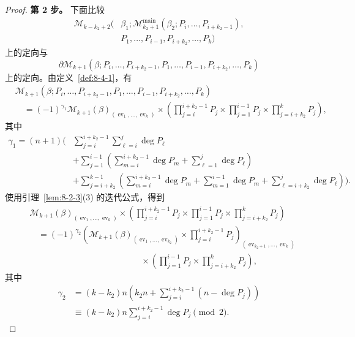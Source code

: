 \begin{proof}
\par\smallskip\noindent\textbf{第 2 步。}
下面比较
\[
\begin{aligned}
 \mathcal M_{k-k_2+2}\bigl(&\beta_1;
 \mathcal M_{k_2+1}^{\mathrm{main}}
 (\beta_2;P_i,\ldots,P_{i+k_2-1}),\\[-2pt]
 &P_1,\ldots,P_{i-1},P_{i+k_2},\ldots,P_k\bigr)
\end{aligned}
\]
上的定向与
\[
 \partial\mathcal M_{k+1}
 (\beta;P_i,\ldots,P_{i+k_2-1},P_1,\ldots,
 P_{i-1},P_{i+k_2},\ldots,P_k)
\]
上的定向。由定义~\ref{def:8-4-1}，有
\[
\begin{aligned}
 &\mathcal M_{k+1}
 (\beta;P_i,\ldots,P_{i+k_2-1},P_1,\ldots,
 P_{i-1},P_{i+k_2},\ldots,P_k)\\
 &\quad={}
 (-1)^{\gamma_1}\mathcal M_{k+1}(\beta)_
 {(\operatorname{ev}_1,\ldots,\operatorname{ev}_k)}
 \times\left(
 \prod_{j=i}^{i+k_2-1}P_j\times
 \prod_{j=1}^{i-1}P_j\times
 \prod_{j=i+k_2}^{k}P_j\right),
\end{aligned}
\]
其中
\[
\begin{aligned}
 \gamma_1=(n+1)\Bigg(&
 \sum_{j=i}^{i+k_2-1}\sum_{\ell=i}^{j}\deg P_\ell\\
 &+\sum_{j=1}^{i-1}\left(
   \sum_{m=i}^{i+k_2-1}\deg P_m
   +\sum_{\ell=1}^{j}\deg P_\ell\right)\\
 &+\sum_{j=i+k_2}^{k-1}\left(
   \sum_{m=i}^{i+k_2-1}\deg P_m
   +\sum_{m=1}^{i-1}\deg P_m
   +\sum_{\ell=i+k_2}^{j}\deg P_\ell\right)\Bigg).
\end{aligned}
\]
使用引理~\ref{lem:8-2-3}(3) 的迭代公式，得到
\[
\begin{aligned}
 &\mathcal M_{k+1}(\beta)_
 {(\operatorname{ev}_1,\ldots,\operatorname{ev}_k)}
 \times\left(
 \prod_{j=i}^{i+k_2-1}P_j\times
 \prod_{j=1}^{i-1}P_j\times
 \prod_{j=i+k_2}^{k}P_j\right)\\
 &\quad={}
 (-1)^{\gamma_2}
 \left(
 \mathcal M_{k+1}(\beta)_
 {(\operatorname{ev}_1,\ldots,\operatorname{ev}_{k_2})}
 \times\prod_{j=i}^{i+k_2-1}P_j
 \right)_
 {(\operatorname{ev}_{k_2+1},\ldots,\operatorname{ev}_k)}\\[-2pt]
 &\hspace{13em}{}\times
 \left(\prod_{j=1}^{i-1}P_j\times
 \prod_{j=i+k_2}^{k}P_j\right),
\end{aligned}
\]
其中
\[
\begin{aligned}
 \gamma_2
 &=(k-k_2)n\left(k_2n+
 \sum_{j=i}^{i+k_2-1}(n-\deg P_j)\right)\\
 &\equiv(k-k_2)n\sum_{j=i}^{i+k_2-1}\deg P_j\pmod2.
\end{aligned}
\]


\end{proof}

